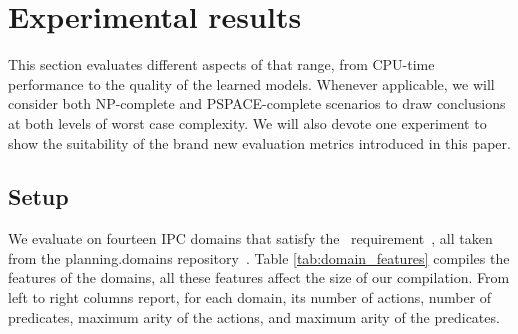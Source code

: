 
\section{Experimental results}
\label{sec:experiments}

This section evaluates different aspects of \FAMA that range, from CPU-time performance to the quality of the learned models. Whenever applicable, we will consider both NP-complete and PSPACE-complete scenarios to draw conclusions at both levels of worst case complexity. We will also devote one experiment to show the suitability of the brand new evaluation metrics introduced in this paper. 

\subsection{Setup}
We evaluate \FAMA on fourteen IPC domains that satisfy the \strips\ requirement~\cite{fox2003pddl2}, all taken from the {\sc planning.domains} repository~\cite{muise2016planning}. Table \ref{tab:domain_features} compiles the features of the domains, all these features affect the size of our compilation. From left to right columns report, for each domain, its number of actions, number of predicates, maximum arity of the actions, and maximum arity of the predicates. %

